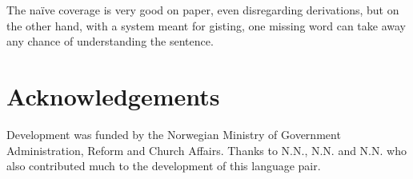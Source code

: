 The na\"{i}ve coverage is very good on paper, even disregarding
derivations, but on the other hand, with a system meant for gisting,
one missing word can take away any chance of understanding the
sentence.

\section*{Acknowledgements}
Development was funded by the Norwegian Ministry of Government
Administration, Reform and Church Affairs. Thanks to N.N., N.N. and
N.N. who also contributed much to the development of this language
pair.


